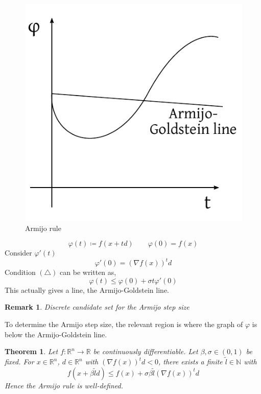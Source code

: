 \documentclass[a4paper]{article}
\newcounter{lecref}[subsection]
\numberwithin{lecref}{subsection}
\newtheorem{theorem}[lecref]{Theorem}
\newtheorem*{Remark}{Remark}
\begin{document}
\begin{figure}[t]
	\begin{center}
		\includegraphics{img/30_armijo.pdf}
		\caption{Armijo rule}
		\label{img:armijo}
	\end{center}
\end{figure}

\[ \varphi(t) \coloneqq f(x + td) \qquad \varphi(0) = f(x) \]
Consider $\varphi'(t)$
\[ \varphi'(0) = \left(\nabla f(x)\right)^t d \]
Condition $(\triangle)$ can be written as,
\[ \varphi(t) \leq \varphi(0) + \sigma t \varphi'(0)  \]
This actually gives a line, the Armijo-Goldstein line.

\begin{Remark}
	Discrete candidate set for the Armijo step size
\end{Remark}

To determine the Armijo step size, the relevant region is where the graph of $\varphi$ is below the Armijo-Goldstein line.

\begin{theorem}
	\label{theorem:5.4.1}
	Let $f: \mathbb R^n \to \mathbb R$ be continuously differentiable.
	Let $\beta, \sigma \in (0,1)$ be fixed. For $x \in \mathbb R^n$, $d \in \mathbb R^n$ with $(\nabla f(x))^t d < 0$,
	there exists a finite $\tilde l \in \mathbb N$ with
	\[ f(x + \beta \tilde l d) \leq f(x) + \sigma \beta \tilde l (\nabla f(x))^t d \]
	Hence the Armijo rule is well-defined.
\end{theorem}
\end{document}
